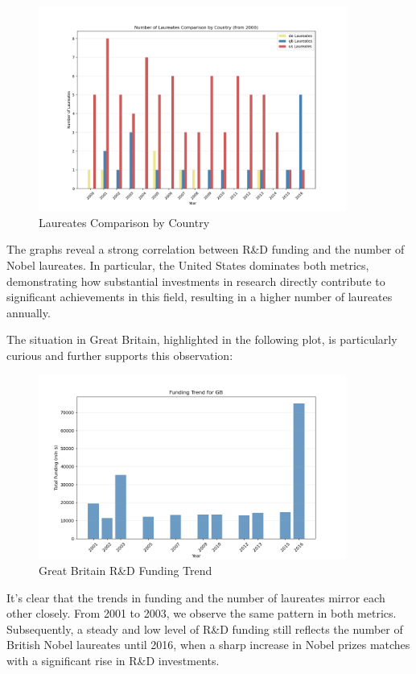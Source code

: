 \documentclass{article}
\begin{document}
\begin{figure}[h!]
    \centering
    \includegraphics[width=0.9\textwidth]{../queries/plots/laureates_comparison_by_country.png}
    \caption{Laureates Comparison by Country}
\end{figure}

The graphs reveal a strong correlation between R\&D funding and the number of Nobel laureates. In particular, the United States dominates both metrics, demonstrating how substantial investments in research directly contribute to significant achievements in this field, resulting in a higher number of laureates annually.

The situation in Great Britain, highlighted in the following plot, is particularly curious and further supports this observation:

\begin{figure}[h!]
    \centering
    \includegraphics[width=0.9\textwidth]{../queries/plots/gb_funding_trend_bar.png}
    \caption{Great Britain R\&D Funding Trend}
\end{figure}

It's clear that the trends in funding and the number of laureates mirror each other closely. From 2001 to 2003, we observe the same pattern in both metrics. Subsequently, a steady and low level of R\&D funding still reflects the number of British Nobel laureates until 2016, when a sharp increase in Nobel prizes matches with a significant rise in R\&D investments.
\end{document}
